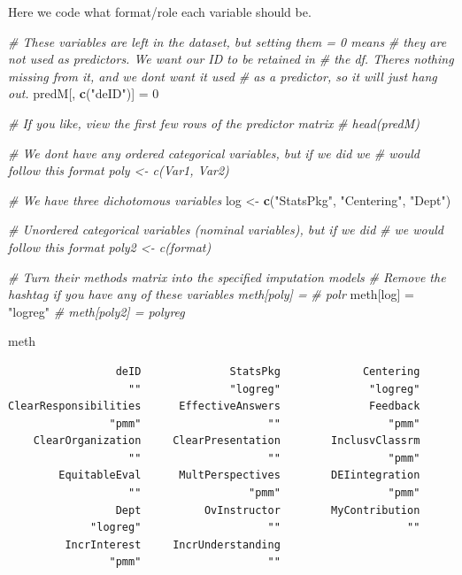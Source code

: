 \documentclass[
  11pt,
]{book}
\newenvironment{Shaded}{\begin{snugshade}}{\end{snugshade}}
\newcommand{\CommentTok}[1]{\textcolor[rgb]{0.37,0.37,0.37}{\textit{#1}}}
\newcommand{\DecValTok}[1]{\textcolor[rgb]{0.06,0.06,0.06}{#1}}
\newcommand{\FunctionTok}[1]{\textcolor[rgb]{0.27,0.27,0.27}{\textbf{#1}}}
\newcommand{\NormalTok}[1]{#1}
\newcommand{\OtherTok}[1]{\textcolor[rgb]{0.37,0.37,0.37}{#1}}
\newcommand{\StringTok}[1]{\textcolor[rgb]{0.5,0.5,0.5}{#1}}
\begin{document}
Here we code what format/role each variable should be.

\begin{Shaded}
\begin{Highlighting}[]
\CommentTok{\# These variables are left in the dataset, but setting them = 0 means}
\CommentTok{\# they are not used as predictors.  We want our ID to be retained in}
\CommentTok{\# the df.  There\textquotesingle{}s nothing missing from it, and we don\textquotesingle{}t want it used}
\CommentTok{\# as a predictor, so it will just hang out.}
\NormalTok{predM[, }\FunctionTok{c}\NormalTok{(}\StringTok{"deID"}\NormalTok{)] }\OtherTok{=} \DecValTok{0}

\CommentTok{\# If you like, view the first few rows of the predictor matrix}
\CommentTok{\# head(predM)}

\CommentTok{\# We don\textquotesingle{}t have any ordered categorical variables, but if we did we}
\CommentTok{\# would follow this format poly \textless{}{-} c(\textquotesingle{}Var1\textquotesingle{}, \textquotesingle{}Var2\textquotesingle{})}

\CommentTok{\# We have three dichotomous variables}
\NormalTok{log }\OtherTok{\textless{}{-}} \FunctionTok{c}\NormalTok{(}\StringTok{"StatsPkg"}\NormalTok{, }\StringTok{"Centering"}\NormalTok{, }\StringTok{"Dept"}\NormalTok{)}

\CommentTok{\# Unordered categorical variables (nominal variables), but if we did}
\CommentTok{\# we would follow this format poly2 \textless{}{-} c(\textquotesingle{}format\textquotesingle{})}

\CommentTok{\# Turn their methods matrix into the specified imputation models}
\CommentTok{\# Remove the hashtag if you have any of these variables meth[poly] =}
\CommentTok{\# \textquotesingle{}polr\textquotesingle{}}
\NormalTok{meth[log] }\OtherTok{=} \StringTok{"logreg"}
\CommentTok{\# meth[poly2] = \textquotesingle{}polyreg\textquotesingle{}}

\NormalTok{meth}
\end{Highlighting}
\end{Shaded}

\begin{verbatim}
                 deID              StatsPkg             Centering 
                   ""              "logreg"              "logreg" 
ClearResponsibilities      EffectiveAnswers              Feedback 
                "pmm"                    ""                 "pmm" 
    ClearOrganization     ClearPresentation        InclusvClassrm 
                   ""                    ""                 "pmm" 
        EquitableEval      MultPerspectives        DEIintegration 
                   ""                 "pmm"                 "pmm" 
                 Dept          OvInstructor        MyContribution 
             "logreg"                    ""                    "" 
         IncrInterest     IncrUnderstanding 
                "pmm"                    "" 
\end{verbatim}
\end{document}
